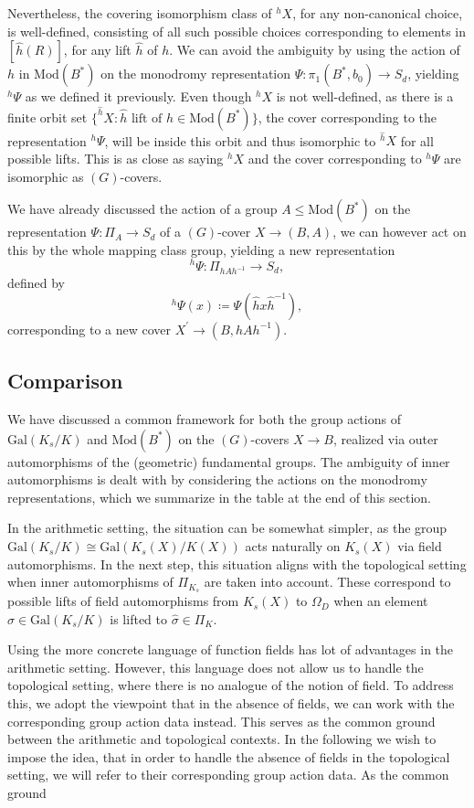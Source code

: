 \documentclass[10pt]{amsart}
\theoremstyle{definition}
\newcommand{\Gal}{{ \mathrm{Gal}}}
\begin{document}
Nevertheless, the covering isomorphism class of ${^h \! X}$, for any non-canonical choice, is well-defined, consisting of all such possible choices corresponding to elements in $[\hat{h}(R)]$, for any lift $\hat{h} $ of $h$.
We can avoid the ambiguity by using the action of $h$ in $\mathrm{Mod}(B^*)$ on the monodromy representation $\Psi\colon \pi_1(B^*,b_0)\rightarrow S_d$, yielding ${^h\Psi}$ as we defined it previously. Even though $^hX$ is not well-defined, as there is a finite orbit set $\{ ^{\hat{h}\! }X  :  \hat{h} \textrm{ lift of } h \in \mathrm{Mod}(B^*)\}$, the cover corresponding to the representation $^h \Psi$, will be inside this orbit and thus isomorphic to $^{\hat{h}}\! X$ for all possible lifts. This is as close as saying $^hX$ and the cover corresponding to $^h\Psi$ are isomorphic as $(G)$-covers.

We have already discussed the action of a group $A\leq \mathrm{Mod}(B^*)$ on the representation $\Psi\colon \Pi_A\rightarrow S_d$ of a $(G)$-cover $X\rightarrow (B,A)$, we can however act on this by the whole mapping class group, yielding a new representation 
\[^h\Psi \colon \Pi_{hAh^{-1}} \rightarrow S_d,\] defined by
\[^h\Psi(x) \coloneqq \Psi(\hat{h}x\hat{h}^{-1}),\] corresponding to a new cover $X^\prime\rightarrow (B,hAh^{-1})$.

\subsection{Comparison}
We have discussed a common framework for both the group actions of $\Gal(K_s/K)$ and $\mathrm{Mod}(B^*)$ on the $(G)$-covers $X\rightarrow B$, realized via outer automorphisms of the (geometric) fundamental groups. The ambiguity of inner automorphisms is dealt with by considering the actions on the monodromy representations, which we summarize in the table at the end of this section.

In the arithmetic setting, the situation can be somewhat simpler, as the group $\Gal(K_s/K)\cong \Gal(K_s(X)/K(X))$ acts naturally on $K_s(X)$ via field automorphisms. In the next step, this situation aligns with the topological setting when inner automorphisms of $\Pi_{K_s}$ are taken into account. These correspond to possible lifts of field automorphisms from $K_s(X)$ to $\Omega_D$ when an element $\sigma \in \Gal(K_s/K)$ is lifted to $\hat{\sigma} \in \Pi_K$.


Using the more concrete language of function fields has lot of advantages in the arithmetic setting. However, this language does not 
allow us to handle the topological setting, where there is no analogue of the notion of field. 
To address this, we adopt the viewpoint that in the absence of fields, we can work with the corresponding group action data instead. This serves as the common ground between the arithmetic and topological contexts.
In the following we wish to impose the idea, 
that in order to handle the absence of fields in the topological setting, we will refer to their corresponding group action data. As the common ground 
\end{document}
